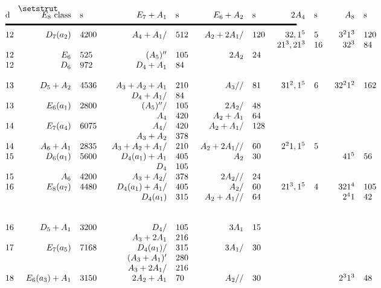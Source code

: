 $$
\vbox{
\setstrut
\offinterlineskip
%
			\tabskip = 0pt plus 1fil
\halign to \hsize{
	#\hfil		\tabskip = 0.5 cm&	%
	\hfil #		\tabskip = 0.25cm&	%
	#\hfil		\tabskip = 0.25cm&	%
	\strut#		\tabskip = 0.25cm&	%
	\hfil #		\tabskip = 0.25cm&	%
	#\hfil		\tabskip = 0.5 cm&	%
	\hfil #		\tabskip = 0.25cm&	%
	#\hfil		\tabskip = 0.5 cm&	%
	\hfil #		\tabskip = 0.25cm&	%
	#\hfil		\tabskip = 0.5 cm&	%
	\hfil #		\tabskip = 0.25cm&	%
	#\hfil		\tabskip = 0.5 cm&	%
	\hfil #		\tabskip = 0.25cm&	%
	#\hfil		\tabskip = 0pt plus 1fil\cr	%
d&  $E_8$ class&  s& \omit& $E_7+A_1$&  s&  $E_6+A_2$&  s&  $2A_4$&  
	s&  $A_8$&  s&  $D_8$&  s\cr\noalign{\vskip 0.2cm
						\hrule height 2pt
						\vskip 0.2cm}
12&  $D_7(a_2)$&  4200&&  $A_4+A_1$/&  512&  $A_2+2A_1$/&  120&  $32,1^5$&  5&
	$3^21^3$&  120&  $53^31^2$&  448\cr
&&&&&&&&  $21^3,21^3$&  16&  $32^3$&  84&  $4^2a$&  140\cr
12&  $E_6$&  525&&  $(A_5)^{\prime\prime}$&  105&  $2A_2$&  24&&&&&  $91^7$&  35\cr
12&  $D_6$&  972&&  $D_4+A_1$&  84&&&&&&&  $4^2b$&  140\cr
&&&&&&&&&&&&  $72^41$&  56\cr
13&  $D_5+A_2$&  4536&&  $A_3+A_2+A_1$&  210&  $A_3$//&  81&
	$31^2,1^5$&  6&  $32^21^2$&  162&  $4^23^21^2$&  560\cr
&&&& $D_4+A_1$/&  84&&&&&&&  $53^22^21$&  168\cr
13&  $E_6(a_1)$&  2800&&  $(A_5)^{\prime\prime}$/&  105&  $2A_2$/&  48&&&&&  
	$731^6$&  160\cr
&&&&  $A_4$&  420&  $A_2+A_1$&  64&&&&&&\cr
14&  $E_7(a_4)$&  6075&&  $A_4$/&  420&  $A_2+A_1$/&  128&&&&&  $5^21^6$& 280\cr
&&&&  $A_3+A_2$&  378&&&&&&&  $72^21^5$&  90\cr
14&  $A_6+A_1$&  2835&&  $A_3+A_2+A_1$/&  210&  $A_2+2A_1$//&  60&  $2^21,1^5$&
	5&&&&\cr
15&  $D_6(a_1)$&  5600&&  $D_4(a_1)+A_1$&  405&  $A_2$&  30&&&  $41^5$&  56&
	$532^4$&  336\cr
&&&&  $D_4$&  105&&&&&&&&\cr
15&  $A_6$&  4200&&  $A_3+A_2$/&  378&  $2A_2$//&  24&&&&& $53^21^5$& 280\cr
16&  $E_8(a_7)$&  4480&&  $D_4(a_1) + A_1$/&  405&  $A_2$/&  60&  $21^3,1^5$&
	4&  $321^4$&  105&  $4^22^4a$&  315\cr
&&&&  $D_4(a_1)$&  315&  $A_2+A_1$//&  64&&&  $2^41$&  42&  $532^21^4$&  280\cr
&&&&&&&&&&&&  $4^231^5$&  252\cr
&&&&&&&&&&&&  $3^51$&  140\cr
16&  $D_5+A_1$&  3200&&  $D_4$/&  105&  $3A_1$&  15&&&&&  $4^22^4b$&  315\cr
&&&&  $A_3+2A_1$&  216&&&&&&&&\cr
17&  $E_7(a_5)$&  7168&&  $D_4(a_1)$/&  315&  $3A_1$/&  30&&&&&  $4^22^21^4$&
	448\cr
&&&&  $(A_3+A_1)'$&  280&&&&&&&  $3^42^2$&  280\cr
&&&&  $A_3+2A_1$/&  216&&&&&&&&\cr
18&  $E_6(a_3)+A_1$&  3150&&  $2A_2+A_1$&  70&  $A_2$//&  30&&&  
	$2^31^3$&  48&&\cr
}}$$
